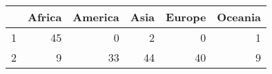 \begin{table}[ht]
\centering
\begin{tabular}{rrrrrr}
  \hline
 & Africa & America & Asia & Europe & Oceania \\ 
  \hline
1 &  45 &   0 &   2 &   0 &   1 \\ 
  2 &   9 &  33 &  44 &  40 &   9 \\ 
   \hline
\end{tabular}
\end{table}

